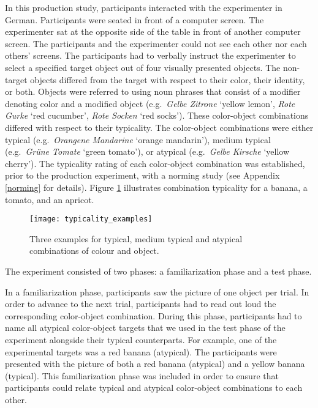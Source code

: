 \documentclass[
]{article}
\begin{document}
In this production study, participants interacted with the experimenter in German.
Participants were seated in front of a computer screen.
The experimenter sat at the opposite side of the table in front of another computer screen.
The participants and the experimenter could not see each other nor each others' screens.
The participants had to verbally instruct the experimenter to select a specified target object out of four visually presented objects.
The non-target objects differed from the target with respect to their color, their identity, or both.
Objects were referred to using noun phrases that consist of a modifier denoting color and a modified object (e.g.~\emph{Gelbe Zitrone} `yellow lemon', \emph{Rote Gurke} `red cucumber', \emph{Rote Socken} `red socks').
These color-object combinations differed with respect to their typicality.
The color-object combinations were either typical (e.g.~\emph{Orangene Mandarine} `orange mandarin'), medium typical (e.g.~\emph{Grüne Tomate} `green tomato'), or atypical (e.g.~\emph{Gelbe Kirsche} `yellow cherry').
The typicality rating of each color-object combination was established, prior to the production experiment, with a norming study (see Appendix \ref{norming} for details).
Figure \ref{fig:image0} illustrates combination typicality for a banana, a tomato, and an apricot.

\begin{figure}[tbp]

{\centering \texttt{[image: typicality\_examples]} 

}

\caption{Three examples for typical, medium typical and atypical combinations of colour and object.}\label{fig:image0}
\end{figure}

The experiment consisted of two phases: a familiarization phase and a test phase.

In a familiarization phase, participants saw the picture of one object per trial.
In order to advance to the next trial, participants had to read out loud the corresponding color-object combination.
During this phase, participants had to name all atypical color-object targets that we used in the test phase of the experiment alongside their typical counterparts.
For example, one of the experimental targets was a red banana (atypical).
The participants were presented with the picture of both a red banana (atypical) and a yellow banana (typical).
This familiarization phase was included in order to ensure that participants could relate typical and atypical color-object combinations to each other.
\end{document}
